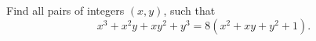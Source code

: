 Find all pairs of integers $(x, y)$, such that
\[ x^3 + x^2y + xy^2 + y^3 = 8(x^2 + xy + y^2 + 1). \]
